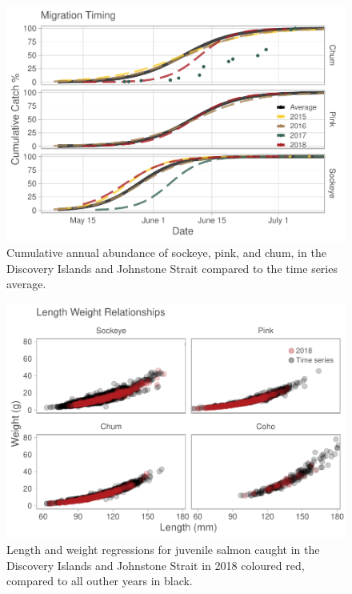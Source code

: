\documentclass[fleqn,10pt]{wlpeerj} %
\begin{document}
\begin{figure}[H]
\includegraphics[width=0.9\linewidth]{Migration_Observations_Report_files/figure-latex/migration-timing-plot-1} \caption{Cumulative annual abundance of sockeye, pink, and chum, in the Discovery Islands and Johnstone Strait compared to the time series average.}\label{fig:migration-timing-plot}
\end{figure}

\begin{figure}
\centering
\includegraphics{Migration_Observations_Report_files/figure-latex/condition-plot-1.pdf}
\caption{\label{fig:condition-plot}Length and weight regressions for juvenile salmon caught in the Discovery Islands and Johnstone Strait in 2018 coloured red, compared to all outher years in black.}
\end{figure}
\end{document}
